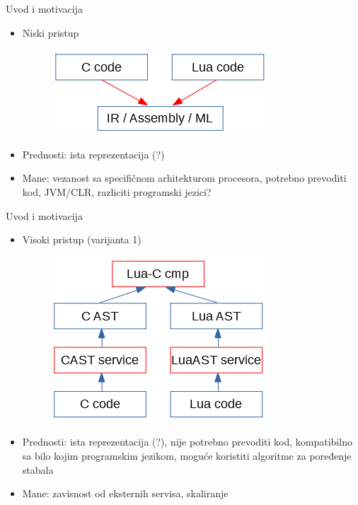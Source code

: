 \documentclass{beamer}
\begin{document}
\begin{frame}{Uvod i motivacija}
    \begin{itemize}
        \item Niski pristup
        \begin{figure}[h!]
            \centering
            \includegraphics[scale=0.8]{images/approach_1.PNG}
        \end{figure}
        \item Prednosti: ista reprezentacija (?)
        \item Mane: vezanost sa specifi\v{c}nom arhitekturom procesora, potrebno prevoditi kod, JVM/CLR, razliciti programski jezici?
    \end{itemize}
\end{frame}

\begin{frame}{Uvod i motivacija}
    \begin{itemize}
        \item Visoki pristup (varijanta 1)
        \begin{figure}[h!]
            \centering
            \includegraphics[scale=0.8]{images/approach_2.PNG}
        \end{figure}
        \item Prednosti: ista reprezentacija (?), nije potrebno prevoditi kod, kompatibilno sa bilo kojim programskim jezikom, mogu\'c{}e koristiti algoritme za poređenje stabala
        \item Mane: zavisnost od eksternih servisa, skaliranje
    \end{itemize}
\end{frame}
\end{document}
